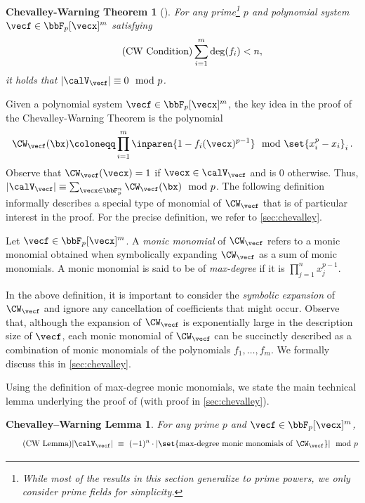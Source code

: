 \theoremstyle{plain}
\newtheorem*{cwthm}{Chevalley-Warning Theorem}
\begin{cwthm}[\cite{r15,r37}]
For any prime\footnote{While most of the results in this section
generalize to prime powers, we only consider prime fields for simplicity.} $p$ and polynomial system
$\vecf \in \bbF_p[\vecx]^m$ satisfying\vspace{-3.5mm}
\begin{equation}
\tag{CW Condition}
\sum_{i = 1}^m \deg(f_i) < n,\vspace*{-3mm}
\label{eq:CWcondition}
\end{equation}
it holds that $|\calV_{\vecf}| \equiv 0 \mod{p}$.
\end{cwthm}

\noindent Given a polynomial system $\vecf \in \bbF_p[\vecx]^m$,
the key idea in the proof of the Chevalley-Warning Theorem is the polynomial
\[ \CW_{\vecf}(\bx) \coloneqq \prod_{i = 1}^m \inparen{1 - f_i(\vecx)^{p - 1}} \mod{\set{x_i^p - x_i}_i}\,. \] Observe that $\CW_{\vecf}(\vecx) = 1$ if $\vecx \in \calV_{\vecf}$ and is $0$ otherwise. Thus, $|\calV_{\vecf}| \equiv \sum_{\vecx \in \bbF_p^n} \CW_{\vecf}(\bx) \mod{p}$.
The following definition informally describes a special type of monomial of
$\CW_{\vecf}$ that is of particular interest in the proof. For the precise definition, we
refer to \autoref{sec:chevalley}.

\begin{definition}
	\label{def:max-degreeMonomialInformal}
    Let $\vecf \in \bbF_p[\vecx]^m$.
    			A \textit{monic monomial} of $\CW_{\vecf}$ refers to a monic monomial obtained when symbolically expanding $\CW_{\vecf}$ as a sum of monic monomials. A monic monomial is said to be of \textit{max-degree} if it is
	$\prod_{j = 1}^n x_j^{p - 1}$.

\end{definition}

   In the above definition, it is important to consider the
\emph{symbolic expansion} of $\CW_{\vecf}$ and ignore any cancellation of coefficients that might occur. Observe that, although the
expansion of $\CW_{\vecf}$ is exponentially large in the description size of
$\vecf$, each monic monomial of $\CW_{\vecf}$ can be succinctly described as a combination of monic monomials of the polynomials $f_1, \ldots, f_m$. We formally
discuss this in \autoref{sec:chevalley}.

Using the definition of max-degree monic monomials, we state the main technical
lemma underlying the proof of \CWT (with proof in \autoref{sec:chevalley}).
\theoremstyle{plain}
\newtheorem*{cwthmprinciple}{Chevalley--Warning Lemma}
\begin{cwthmprinciple}
For any prime $p$ and $\vecf \in \bbF_p[\vecx]^m$,
\begin{equation}
	\tag{CW Lemma}
	|\calV_{\vecf}| ~\equiv~ (-1)^n \cdot  |\set{\mathrm{max\text{-}degree~monic~monomials~of~} \CW_{\vecf}}| \mod{p}
	\label{eq:mainPrinciple}
\end{equation}
\end{cwthmprinciple}

